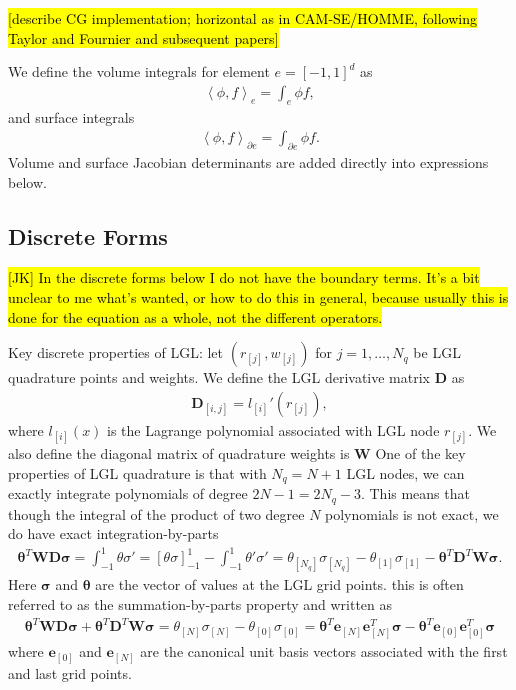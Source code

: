\documentclass{report}
\newcommand{\inner}[2]{ \left\langle #1, #2 \right\rangle }
\newcommand{\mat}[1]{\boldsymbol #1}
\newcommand{\dvec}[1]{\boldsymbol #1}
\begin{document}
\hl{[describe CG implementation; horizontal as in CAM-SE/HOMME, following Taylor and Fournier and subsequent papers]}

We define the volume integrals for element $e = {[-1, 1]}^{d}$ as
\begin{align}
    \inner{\phi}{f}_{e} = \int_{e} \phi f,
\end{align}
and surface integrals
\begin{align}
    \inner{\phi}{f}_{\partial e} = \int_{\partial e} \phi f.
\end{align}
Volume and surface Jacobian determinants are added directly into expressions below.

\subsection*{Discrete Forms}

\hl{[JK] In the discrete forms below I do not have the boundary terms.
It's a bit unclear to me what's wanted, or how to do this in general, because
usually this is done for the equation as a whole, not the different operators.}

Key discrete properties of LGL: let $(r_{[j]}, w_{[j]})$ for $j = 1, \dots, N_q$ be LGL quadrature points and weights.
We define the LGL derivative matrix $\mat{D}$ as
\begin{align}
    \mat{D}_{[i,j]} = l_{[i]}'(r_{[j]}),
\end{align}
where $l_{[i]}(x)$ is the Lagrange polynomial associated with LGL node $r_{[j]}$.
We also define the diagonal matrix of quadrature weights is $\mat{W}$
One of the key properties of LGL quadrature is that with $N_q = N + 1$ LGL nodes, we can exactly integrate polynomials of degree $2N - 1 = 2N_q -3$.
This means that though the integral of the product of two degree $N$ polynomials is not exact, we do have exact integration-by-parts
\begin{align}
    \dvec{\theta}^{T} \mat{W} \mat{D} \dvec{\sigma} =
    \int_{-1}^{1} \theta \sigma' =  
    {\left[\theta \sigma\right]}_{-1}^{1} - \int_{-1}^{1} \theta' \sigma' =
    \theta_{[N_q]} \sigma_{[N_q]} - \theta_{[1]} \sigma_{[1]} -  \dvec{\theta}^{T} \mat{D}^{T} \mat{W} \dvec{\sigma}.
\end{align}
Here $\dvec{\sigma}$ and $\dvec{\theta}$ are the vector of values at the LGL grid points.
this is often referred to as the summation-by-parts property and written as
\begin{align}
    \dvec{\theta}^{T} \mat{W} \mat{D} \dvec{\sigma} + \dvec{\theta}^{T} \mat{D}^{T} \mat{W} \dvec{\sigma}
    =  \theta_{[N]} \sigma_{[N]} - \theta_{[0]} \sigma_{[0]}
    =
    \dvec{\theta}^{T} \dvec{e}_{[N]} \dvec{e}_{[N]}^{T} \dvec{\sigma}
    -
    \dvec{\theta}^{T} \dvec{e}_{[0]} \dvec{e}_{[0]}^{T} \dvec{\sigma}
\end{align}
where $\dvec{e}_{[0]}$ and $\dvec{e}_{[N]}$ are the canonical unit basis vectors associated with the first and last grid points.
\end{document}
